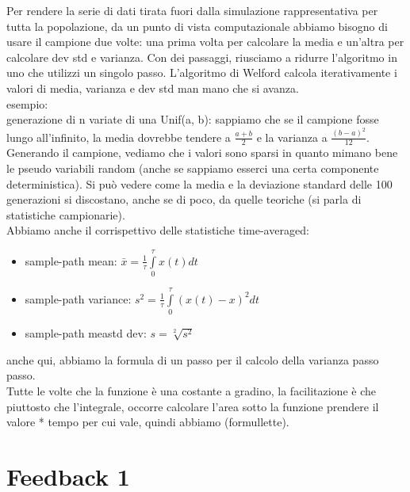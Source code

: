 \documentclass{article}
\begin{document}
Per rendere la serie di dati tirata fuori dalla simulazione rappresentativa per tutta la popolazione, da un punto di vista computazionale abbiamo bisogno di usare il campione due volte:  una prima volta per calcolare la media e un'altra per calcolare dev std e varianza. Con dei passaggi, riusciamo a ridurre l'algoritmo in uno che utilizzi un singolo passo. L'algoritmo di Welford calcola iterativamente i valori di media, varianza e dev std man mano che si avanza.\\ esempio: \\ generazione di n variate di una Unif(a, b): sappiamo che se il campione fosse lungo all'infinito, la media dovrebbe tendere a $\frac{a + b}{2}$ e la varianza a $\frac{(b - a)^2}{12}$. Generando il campione, vediamo che i valori sono sparsi in quanto mimano bene le pseudo variabili random (anche se sappiamo esserci una certa componente deterministica). Si può vedere come la media e la deviazione standard delle 100 generazioni si discostano, anche se di poco, da quelle teoriche (si parla di statistiche campionarie).\\ Abbiamo anche il corrispettivo delle statistiche time-averaged:
\begin{itemize}
\item sample-path mean: $\bar{x} = \frac{1}{\tau} \int\limits_{0}^{\tau} x(t) dt$
\item sample-path variance: $s^2 = \frac{1}{\tau} \int\limits_{0}^{\tau} (x(t)-x)^2 dt$
\item sample-path meastd dev: $s = \sqrt[2]{s^2}$
\end{itemize}
anche qui, abbiamo la formula di un passo per il calcolo della varianza passo passo.\\ Tutte le volte che la funzione è una costante a gradino, la facilitazione è che piuttosto che l'integrale, occorre calcolare l'area sotto la funzione prendere il valore * tempo per cui vale, quindi abbiamo (formullette).





\newpage
\section{Feedback 1}
\end{document}

